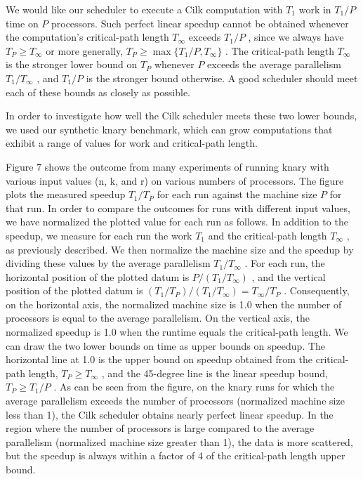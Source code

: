 \documentclass[
]{article}
\begin{document}
We would like our scheduler to execute a Cilk computation with \(T_{1}\)
work in \(T_{1}/P\) time on \(P\) processors. Such perfect linear
speedup cannot be obtained whenever the computation's critical-path
length \(T_{\infty}\) exceeds \(T_{1}/P\) , since we always have
\(T_{P} \geq T_{\infty}\) or more generally,
\(T_{P} \geq \max \{T_{1}/P, T_{\infty}\}\) . The critical-path length
\(T_{\infty}\) is the stronger lower bound on \(T_{P}\) whenever \(P\)
exceeds the average parallelism \(T_{1}/T_{\infty}\) , and \(T_{1}/P\)
is the stronger bound otherwise. A good scheduler should meet each of
these bounds as closely as possible.

In order to investigate how well the Cilk scheduler meets these two
lower bounds, we used our synthetic knary benchmark, which can grow
computations that exhibit a range of values for work and critical-path
length.

Figure 7 shows the outcome from many experiments of running knary with
various input values (n, k, and r) on various numbers of processors. The
figure plots the measured speedup \(T_{1} / T_{P}\) for each run against
the machine size \(P\) for that run. In order to compare the outcomes
for runs with different input values, we have normalized the plotted
value for each run as follows. In addition to the speedup, we measure
for each run the work \(T_{1}\) and the critical-path length
\(T_{\infty}\) , as previously described. We then normalize the machine
size and the speedup by dividing these values by the average parallelism
\(T_{1} / T_{\infty}\) . For each run, the horizontal position of the
plotted datum is \(P / (T_{1} / T_{\infty})\) , and the vertical
position of the plotted datum is
\((T_{1} / T_{P}) / (T_{1} / T_{\infty}) = T_{\infty} / T_{P}\) .
Consequently, on the horizontal axis, the normalized machine size is 1.0
when the number of processors is equal to the average parallelism. On
the vertical axis, the normalized speedup is 1.0 when the runtime equals
the critical-path length. We can draw the two lower bounds on time as
upper bounds on speedup. The horizontal line at 1.0 is the upper bound
on speedup obtained from the critical-path length,
\(T_{P} \geq T_{\infty}\) , and the 45-degree line is the linear speedup
bound, \(T_{P} \geq T_{1} / P\) . As can be seen from the figure, on the
knary runs for which the average parallelism exceeds the number of
processors (normalized machine size less than 1), the Cilk scheduler
obtains nearly perfect linear speedup. In the region where the number of
processors is large compared to the average parallelism (normalized
machine size greater than 1), the data is more scattered, but the
speedup is always within a factor of 4 of the critical-path length upper
bound.
\end{document}
